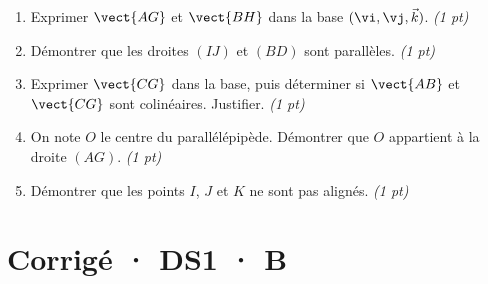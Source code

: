 \begin{enumerate}

\item Exprimer $\vect{AG}$ et $\vect{BH}$ dans la base $(\vi,\vj,\vec k)$. \hfill\textit{(1 pt)}

\item Démontrer que les droites $(IJ)$ et $(BD)$ sont parallèles. \hfill\textit{(1 pt)}

\item Exprimer $\vect{CG}$ dans la base, puis déterminer si $\vect{AB}$ et $\vect{CG}$ sont colinéaires. Justifier. \hfill\textit{(1 pt)}

\item On note $O$ le centre du parallélépipède. Démontrer que $O$ appartient à la droite $(AG)$. \hfill\textit{(1 pt)}

\item Démontrer que les points $I$, $J$ et $K$ ne sont pas alignés. \hfill\textit{(1 pt)}

\end{enumerate}

\ifprof\clearpage

\section*{Corrigé · DS1 · B}\label{cor:1-4}


